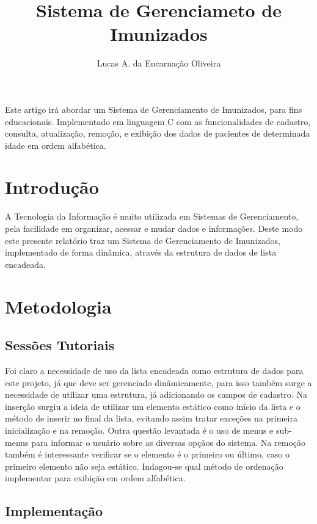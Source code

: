 \documentclass[12pt]{article}
\title{Sistema de Gerenciameto de Imunizados}
\author{Lucas A. da Encarnação Oliveira\inst{1} }
\begin{document}
 

\maketitle
     
\begin{resumo} 
  Este artigo irá abordar um Sistema de Gerenciamento de Imunizados, para fins
  educacionais. Implementado em linguagem C com as funcionalidades de cadastro,
  consulta, atualização, remoção, e exibição dos dados de pacientes de determinada
  idade em ordem alfabética.
\end{resumo}


\section{Introdução}

A Tecnologia da Informação é muito utilizada em Sistemas de Gerenciamento,
pela facilidade em organizar, acessar e mudar dados e informações. Deste modo
este presente relatório traz um Sistema de Gerenciamento de Imunizados, implementado
de forma dinâmica, através da estrutura de dados de lista encadeada.

\section{Metodologia} \label{sec:firstpage}
   

\subsection{Sessões Tutoriais}

Foi claro a necessidade de uso da lista encadeada como estrutura de dados
para este projeto, já que deve ser gerenciado dinâmicamente, para isso também
surge a necessidade de utilizar uma estrutura, já adicionando os campos de cadastro.
Na inserção surgiu a ideia de utilizar um elemento estático como início da lista
e o método de inserir no final da lista, evitando assim tratar exceções na primeira
inicialização e na remoção. Outra questão levantada é o uso de menus e sub-menus para
informar o usuário sobre as diversas opçãos do sistema. Na remoção também é interessante
verificar se o elemento é o primeiro ou último, caso o primeiro elemento não seja 
estático. Indagou-se qual método de ordenação implementar para exibição em
ordem alfabética.

\subsection{Implementação}
\end{document}
